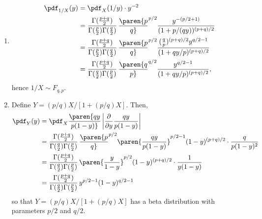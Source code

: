 \documentclass{homework}
\begin{document}
{\begin{enumerate}[label={(\alph*)}, topsep=0pt]
        \item \begin{align*}
                  \pdf_{1/X}(y) & = \pdf_X(1/y)\cdot y^{-2}
                  \\ &= \frac{\Gamma({p+q\over 2})}{\Gamma({p\over 2})\Gamma({q\over 2})}\,\paren{p\over q}^{p/2}\frac{y^{-(p/2+1)}}{{(1+p/(qy))^{(p+q)/2}}}
                  \\ &= \frac{\Gamma({p+q\over 2})}{\Gamma({p\over 2})\Gamma({q\over 2})}\,\paren{p\over q}^{p/2}\frac{(\frac q p)^{(p+q)/2}y^{q/2-1}}{{(1 + qy/p)^{(p+q)/2}}}
                  \\ &= \frac{\Gamma({p+q\over 2})}{\Gamma({q\over 2})\Gamma({p\over 2})}\,\paren{q\over p}^{q/2}\frac{y^{q/2-1}}{{(1 + qy/p)^{(p+q)/2}}},
              \end{align*}
              hence $1/X\sim F_{q,p}$.

        \item Define $Y=(p/q)X/[1+(p/q)X]$. Then,
              \begin{align*}
                  \pdf_{Y}(y) & = \pdf_X\paren{ qy\over p(1-y) } \left|\frac{\partial}{\partial y} \frac{qy}{p(1-y)}\right|
                  \\ &= \frac{\Gamma({p+q\over 2})}{\Gamma({q\over 2})\Gamma({p\over 2})}\,\paren{p\over q}^{p/2}\paren{\frac{qy}{p(1-y)}}^{p/2-1}(1-y)^{(p+q)/2}\cdot \frac{q}{p(1-y)^2}
                  \\ &= \frac{\Gamma({p+q\over 2})}{\Gamma({q\over 2})\Gamma({p\over 2})}\,\paren{\frac{y}{1-y}}^{p/2}(1-y)^{(p+q)/2}\cdot \frac{1}{y(1-y)}
                  \\ &= \frac{\Gamma({p+q\over 2})}{\Gamma({q\over 2})\Gamma({p\over 2})}\,y^{p/2-1} (1-y)^{q/2-1}
              \end{align*}
              so that $Y=(p/q)X/[1+(p/q)X]$ has a beta distribution with parameters $p/2$ and $q/2$.
    \end{enumerate}
}

\end{document}
